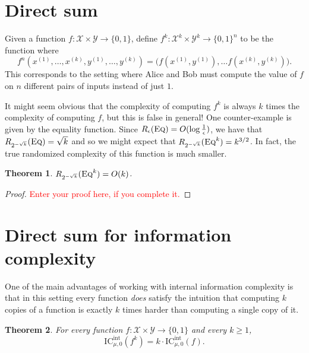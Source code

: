 \documentclass[11pt,oneside]{book}
\theoremstyle{plain}
\newtheorem{theorem}{Theorem}
\theoremstyle{definition}
\theoremstyle{plain}
\newcommand{\calX}{\mathcal{X}}
\newcommand{\calY}{\mathcal{Y}}
\newcommand{\Eq}{\textsc{Eq}}
\newcommand{\ICint}{\mathrm{IC}^{\mathrm{int}}}
\newcommand{\replacethistext}[1]{\textcolor{red}{#1}}
\begin{document}
 
\section{Direct sum}

Given a function $f : \calX \times \calY \to \{0,1\}$, define $f^k : \calX^k \times \calY^k \to \{0,1\}^n$ to be the function where
\[
f^n(x^{(1)},\ldots,x^{(k)},y^{(1)},\ldots,y^{(k)}) = \big( f(x^{(1)},y^{(1)}), \ldots f(x^{(k)}, y^{(k)})\big).
\]
This corresponds to the setting where Alice and Bob must compute the value of $f$ on $n$ different pairs of inputs instead of just $1$.

It might seem obvious that the complexity of computing $f^k$ is always $k$ times the complexity of computing $f$, but this is false in general! One counter-example is given by the equality function. Since $R_\epsilon(\Eq) = O(\log \frac1\epsilon)$, we have that $R_{2^{-\sqrt{k}}}(\Eq) = \sqrt{k}$ and so we might expect that $R_{2^{-\sqrt{k}}}(\Eq^k) = k^{3/2}$. In fact, the true randomized complexity of this function is much smaller.

\begin{theorem}
	$R_{2^{-\sqrt{k}}}(\Eq^k) = O(k)$.
\end{theorem}

\begin{proof}
	\replacethistext{Enter your proof here, if you complete it.}
\end{proof}


 
\section{Direct sum for information complexity}

One of the main advantages of working with internal information complexity is that in this setting every function \emph{does} satisfy the intuition that computing $k$ copies of a function is exactly $k$ times harder than computing a single copy of it.
\begin{theorem}
	For every function $f : \calX \times \calY \to \{0,1\}$ and every $k \ge 1$,
	\[
	\ICint_{\mu,0}(f^k) = k \cdot \ICint_{\mu,0}(f).
	\]
\end{theorem}
\end{document}

